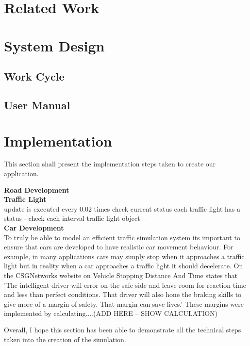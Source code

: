 \documentclass[11pt]{article}
\begin{document}
	\section{Related Work} %
	\section{System Design}
	\subsection{Work Cycle}
	\subsection{User Manual}
	\section{Implementation} %
	This section shall present the implementation steps taken to create our application. 
	
	\textbf{Road Development}\\
	\textbf{Traffic Light}\\
	update is executed every 0.02 times 
	check current status
	each traffic light has a status - check each interval 
	traffic light object -- \\
	\textbf{Car Development}\\
	To truly be able to model an efficient traffic simulation system its important to ensure that cars are developed to have realistic car movement behaviour. For example, in many applications cars may simply stop when it approaches a traffic light but in reality when a car approaches a traffic light it should decelerate. On the CSGNetworks website on Vehicle Stopping Distance And Time \cite{CSGNetwork} states that 'The intelligent driver will error on the safe side and leave room for reaction time and less than perfect conditions. That driver will also hone the braking skills to give more of a margin of safety. That margin can save lives.' These margins were implemented by calculating....(ADD HERE -- SHOW CALCULATION)

	Overall, I hope this section has been able to demonstrate all the technical steps taken into the creation of the simulation. 
	
\end{document}
